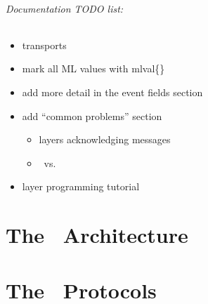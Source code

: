 \documentclass[12pt]{article}
\begin{document}
\paragraph{Documentation TODO list:}
\begin{itemize}
\item transports
\item mark all ML values with mlval\{\}
\item add more detail in the event fields section
\item add ``common problems'' section
\begin{itemize}
\item layers acknowledging messages
\item \UpInit\ vs. \UpView
\end{itemize}
\item layer programming tutorial
\end{itemize}

\newpage
\part{The \ensemble\ Architecture}







\newpage
\part{The \ensemble\ Protocols}

\appendix




%
%
\end{document}
